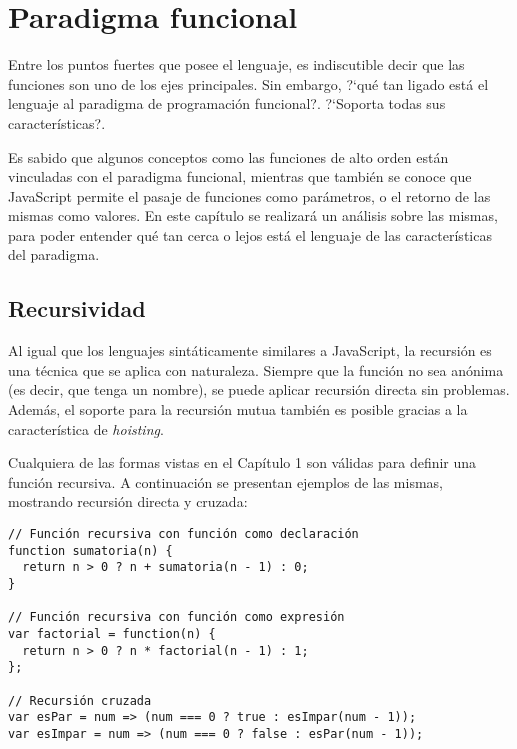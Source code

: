 \chapter{Paradigma funcional}

\label{Chapter3}


Entre los puntos fuertes que posee el lenguaje, es indiscutible decir que las funciones son uno de los ejes principales. Sin embargo, ?`qué tan ligado está el lenguaje al paradigma de programación funcional?. ?`Soporta todas sus características?.

Es sabido que algunos conceptos como las funciones de alto orden están vinculadas con el paradigma funcional, mientras que también se conoce que JavaScript permite el pasaje de funciones como parámetros, o el retorno de las mismas como valores. En este capítulo se realizará un análisis sobre las mismas, para poder entender qué tan cerca o lejos está el lenguaje de las características del paradigma.


\section{Recursividad}

Al igual que los lenguajes sintáticamente similares a JavaScript, la recursión es una técnica que se aplica con naturaleza. Siempre que la función no sea anónima (es decir, que tenga un nombre), se puede aplicar recursión directa sin problemas. Además, el soporte para la recursión mutua también es posible gracias a la característica de \textit{hoisting}.

Cualquiera de las formas vistas en el Capítulo 1 son válidas para definir una función recursiva. A continuación se presentan ejemplos de las mismas, mostrando recursión directa y cruzada:

\begin{lstlisting}[title={Ejemplos de funciones recursivas}]
// Función recursiva con función como declaración
function sumatoria(n) {
  return n > 0 ? n + sumatoria(n - 1) : 0;
}

// Función recursiva con función como expresión
var factorial = function(n) {
  return n > 0 ? n * factorial(n - 1) : 1;
};

// Recursión cruzada
var esPar = num => (num === 0 ? true : esImpar(num - 1));
var esImpar = num => (num === 0 ? false : esPar(num - 1));
\end{lstlisting}

